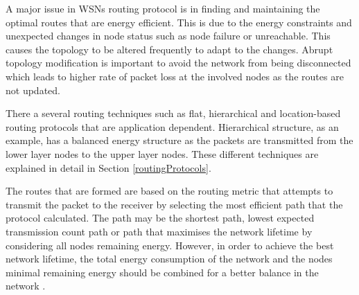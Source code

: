 A major issue in WSNs routing protocol is in finding and maintaining the optimal routes that are energy efficient. This is due to the energy constraints and unexpected changes in node status such as node failure or unreachable. This causes the topology to be altered frequently to adapt to the changes. Abrupt topology modification is important to avoid the network from being disconnected which leads to higher rate of packet loss at the involved nodes as the routes are not updated.

There a several routing techniques such as flat, hierarchical and location-based routing protocols that are application dependent. Hierarchical structure, as an example, has a balanced energy structure as the packets are transmitted from the lower layer nodes to the upper layer nodes. These different techniques are explained in detail in Section \ref{routingProtocols}. 

The routes that are formed are based on the routing metric \cite{pantazis} that attempts to transmit the packet to the receiver by selecting the most efficient path that the protocol calculated. The path may be the shortest path, lowest expected transmission count path \cite{mrhof} or path that maximises the network lifetime by considering all nodes remaining energy. However, in order to achieve the best network lifetime, the total energy consumption of the network and the nodes minimal remaining energy should be combined for a better balance in the network \cite{erapl}.


